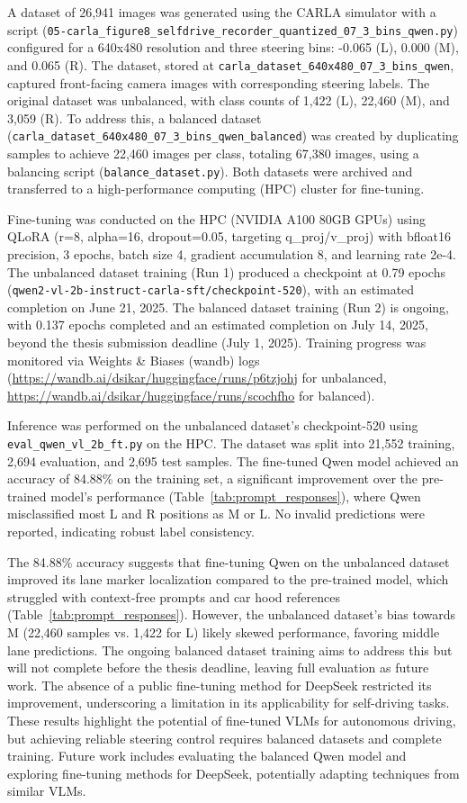 A dataset of 26,941 images was generated using the CARLA simulator with a script (\texttt{05-carla\_figure8\_selfdrive\_recorder\_quantized\_07\_3\_bins\_qwen.py}) configured for a 640x480 resolution and three steering bins: -0.065 (L), 0.000 (M), and 0.065 (R). The dataset, stored at \texttt{carla\_dataset\_640x480\_07\_3\_bins\_qwen}, captured front-facing camera images with corresponding steering labels. The original dataset was unbalanced, with class counts of 1,422 (L), 22,460 (M), and 3,059 (R). To address this, a balanced dataset (\texttt{carla\_dataset\_640x480\_07\_3\_bins\_qwen\_balanced}) was created by duplicating samples to achieve 22,460 images per class, totaling 67,380 images, using a balancing script (\texttt{balance\_dataset.py}). Both datasets were archived and transferred to a high-performance computing (HPC) cluster for fine-tuning.

Fine-tuning was conducted on the HPC (NVIDIA A100 80GB GPUs) using QLoRA (r=8, alpha=16, dropout=0.05, targeting q\_proj/v\_proj) with bfloat16 precision, 3 epochs, batch size 4, gradient accumulation 8, and learning rate 2e-4. The unbalanced dataset training (Run 1) produced a checkpoint at 0.79 epochs (\texttt{qwen2-vl-2b-instruct-carla-sft/checkpoint-520}), with an estimated completion on June 21, 2025. The balanced dataset training (Run 2) is ongoing, with 0.137 epochs completed and an estimated completion on July 14, 2025, beyond the thesis submission deadline (July 1, 2025). Training progress was monitored via Weights \& Biases (wandb) logs (\url{https://wandb.ai/dsikar/huggingface/runs/p6tzjohj} for unbalanced, \url{https://wandb.ai/dsikar/huggingface/runs/scochfho} for balanced).

Inference was performed on the unbalanced dataset's checkpoint-520 using \texttt{eval\_qwen\_vl\_2b\_ft.py} on the HPC. The dataset was split into 21,552 training, 2,694 evaluation, and 2,695 test samples. The fine-tuned Qwen model achieved an accuracy of 84.88\% on the training set, a significant improvement over the pre-trained model's performance (Table~\ref{tab:prompt_responses}), where Qwen misclassified most L and R positions as M or L. No invalid predictions were reported, indicating robust label consistency.

The 84.88\% accuracy suggests that fine-tuning Qwen on the unbalanced dataset improved its lane marker localization compared to the pre-trained model, which struggled with context-free prompts and car hood references (Table~\ref{tab:prompt_responses}). However, the unbalanced dataset's bias towards M (22,460 samples vs. 1,422 for L) likely skewed performance, favoring middle lane predictions. The ongoing balanced dataset training aims to address this but will not complete before the thesis deadline, leaving full evaluation as future work. The absence of a public fine-tuning method for DeepSeek restricted its improvement, underscoring a limitation in its applicability for self-driving tasks. These results highlight the potential of fine-tuned VLMs for autonomous driving, but achieving reliable steering control requires balanced datasets and complete training. Future work includes evaluating the balanced Qwen model and exploring fine-tuning methods for DeepSeek, potentially adapting techniques from similar VLMs.


